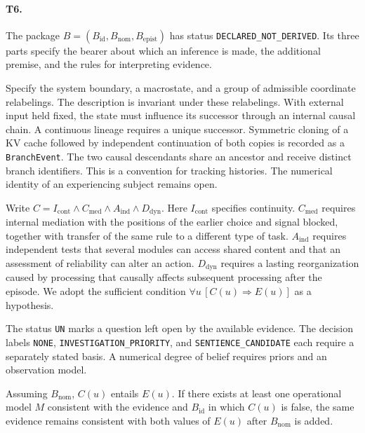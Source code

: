 \paragraph{T6.} The package $B=(B_{\mathrm{id}},B_{\mathrm{nom}},B_{\mathrm{epist}})$ has status \texttt{DECLARED\_NOT\_DERIVED}. Its three parts specify the bearer about which an inference is made, the additional premise, and the rules for interpreting evidence.
\begin{description}[leftmargin=1.35cm,style=nextline]
\item[$B_{\mathrm{id}}$] Specify the system boundary, a macrostate, and a group of admissible coordinate relabelings. The description is invariant under these relabelings. With external input held fixed, the state must influence its successor through an internal causal chain. A continuous lineage requires a unique successor. Symmetric cloning of a KV cache followed by independent continuation of both copies is recorded as a \texttt{BranchEvent}. The two causal descendants share an ancestor and receive distinct branch identifiers. This is a convention for tracking histories. The numerical identity of an experiencing subject remains open.
\item[$B_{\mathrm{nom}}$] Write $C=I_{\mathrm{cont}}\land C_{\mathrm{med}}\land A_{\mathrm{ind}}\land D_{\mathrm{dyn}}$. Here $I_{\mathrm{cont}}$ specifies continuity. $C_{\mathrm{med}}$ requires internal mediation with the positions of the earlier choice and signal blocked, together with transfer of the same rule to a different type of task. $A_{\mathrm{ind}}$ requires independent tests that several modules can access shared content and that an assessment of reliability can alter an action. $D_{\mathrm{dyn}}$ requires a lasting reorganization caused by processing that causally affects subsequent processing after the episode. We adopt the sufficient condition $\forall u\,[C(u)\Rightarrow E(u)]$ as a hypothesis.
\item[$B_{\mathrm{epist}}$] The status \texttt{UN} marks a question left open by the available evidence. The decision labels \texttt{NONE}, \texttt{INVESTIGATION\_PRIORITY}, and \texttt{SENTIENCE\_CANDIDATE} each require a separately stated basis. A numerical degree of belief requires priors and an observation model.
\end{description}
\begin{theorem}
\label{thm:conditional-bridge}
Assuming $B_{\mathrm{nom}}$, $C(u)$ entails $E(u)$. If there exists at least one operational model $M$ consistent with the evidence and $B_{\mathrm{id}}$ in which $C(u)$ is false, the same evidence remains consistent with both values of $E(u)$ after $B_{\mathrm{nom}}$ is added.
\end{theorem}
